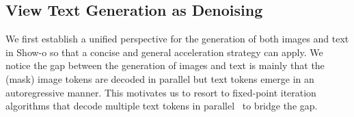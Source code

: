 

\subsection{View Text Generation as Denoising}
We first establish a unified perspective for the generation of both images and text in Show-o so that a concise and general acceleration strategy can apply. 
We notice the gap between the generation of images and text is mainly that the (mask) image tokens are decoded in parallel but text tokens emerge in an autoregressive manner. 
This motivates us to resort to fixed-point iteration algorithms that decode multiple text tokens in parallel~\cite{song2021accelerating,santilli2023accelerating,kou2024cllms} to bridge the gap. 

